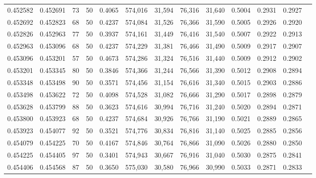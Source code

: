 \begin{tabular}{rrrrrrrrrrrrr}
0.452582 & 0.452691 &    73 &  50 &                                     0.4065 & 574,016 &  31,594 &  76,316 &  31,640 & 0.5004 & 0.2931 & 0.2927 \\
0.452692 & 0.452823 &    68 &  50 &                                     0.4237 & 574,084 &  31,526 &  76,366 &  31,590 & 0.5005 & 0.2926 & 0.2920 \\
0.452826 & 0.452963 &    77 &  50 &                                     0.3937 & 574,161 &  31,449 &  76,416 &  31,540 & 0.5007 & 0.2922 & 0.2913 \\
0.452963 & 0.453096 &    68 &  50 &                                     0.4237 & 574,229 &  31,381 &  76,466 &  31,490 & 0.5009 & 0.2917 & 0.2907 \\
0.453096 & 0.453201 &    57 &  50 &                                     0.4673 & 574,286 &  31,324 &  76,516 &  31,440 & 0.5009 & 0.2912 & 0.2902 \\
0.453201 & 0.453345 &    80 &  50 &                                     0.3846 & 574,366 &  31,244 &  76,566 &  31,390 & 0.5012 & 0.2908 & 0.2894 \\
0.453348 & 0.453498 &    90 &  50 &                                     0.3571 & 574,456 &  31,154 &  76,616 &  31,340 & 0.5015 & 0.2903 & 0.2886 \\
0.453498 & 0.453622 &    72 &  50 &                                     0.4098 & 574,528 &  31,082 &  76,666 &  31,290 & 0.5017 & 0.2898 & 0.2879 \\
0.453628 & 0.453799 &    88 &  50 &                                     0.3623 & 574,616 &  30,994 &  76,716 &  31,240 & 0.5020 & 0.2894 & 0.2871 \\
0.453800 & 0.453923 &    68 &  50 &                                     0.4237 & 574,684 &  30,926 &  76,766 &  31,190 & 0.5021 & 0.2889 & 0.2865 \\
0.453923 & 0.454077 &    92 &  50 &                                     0.3521 & 574,776 &  30,834 &  76,816 &  31,140 & 0.5025 & 0.2885 & 0.2856 \\
0.454079 & 0.454225 &    70 &  50 &                                     0.4167 & 574,846 &  30,764 &  76,866 &  31,090 & 0.5026 & 0.2880 & 0.2850 \\
0.454225 & 0.454405 &    97 &  50 &                                     0.3401 & 574,943 &  30,667 &  76,916 &  31,040 & 0.5030 & 0.2875 & 0.2841 \\
0.454406 & 0.454568 &    87 &  50 &                                     0.3650 & 575,030 &  30,580 &  76,966 &  30,990 & 0.5033 & 0.2871 & 0.2833 \\

\end{tabular}
